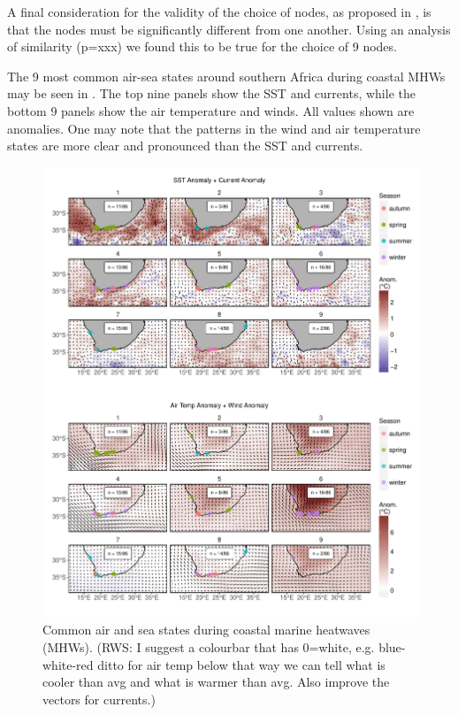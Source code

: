 \documentclass[a4paper,10pt,review]{elsarticle}
\begin{document}
A final consideration for the validity of the choice of nodes, as proposed in \citet{Johnson2013}, is that the nodes must be significantly different from one another. Using an analysis of similarity (p=xxx) we found this to be true for the choice of 9 nodes.


The 9 most common air-sea states around southern Africa during coastal MHWs may be seen in . The top nine panels show the SST and currents, while the bottom 9 panels show the air temperature and winds. All values shown are anomalies. One may note that the patterns in the wind and air temperature states are more clear and pronounced than the SST and currents.

\begin{figure}
\includegraphics[width=1.0\textwidth]{figure_4.pdf}
\caption{Common air and sea states during coastal marine heatwaves (MHWs). (RWS: I suggest a colourbar that has 0=white, e.g. blue-white-red ditto for air temp below that way we can tell what is cooler than avg and what is warmer than avg. Also improve the vectors for currents.)}
\label{figure4}
\end{figure}
\end{document}
